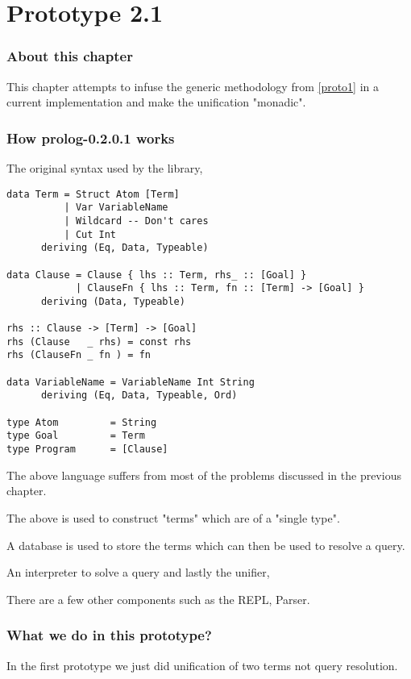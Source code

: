 \documentclass[thesis-solanki.tex]{subfiles}
\begin{document}
\chapter{Prototype 2.1}{\label{proto2.1}}

\subsection{About this chapter}
This chapter attempts to infuse the generic methodology from \ref{proto1} in a current  implementation \cite{prolog-lib}
and make the unification "monadic".

\subsection{How prolog-0.2.0.1 works}

The original syntax used by the library,

\begin{verbatim}
data Term = Struct Atom [Term]
          | Var VariableName
          | Wildcard -- Don't cares 
          | Cut Int
      deriving (Eq, Data, Typeable)

data Clause = Clause { lhs :: Term, rhs_ :: [Goal] }
            | ClauseFn { lhs :: Term, fn :: [Term] -> [Goal] }
      deriving (Data, Typeable)

rhs :: Clause -> [Term] -> [Goal]      
rhs (Clause   _ rhs) = const rhs
rhs (ClauseFn _ fn ) = fn

data VariableName = VariableName Int String
      deriving (Eq, Data, Typeable, Ord)

type Atom         = String
type Goal         = Term
type Program      = [Clause]
\end{verbatim} 

The above language suffers from most of the problems discussed in the previous chapter.

The above is used to construct  "terms" which are of a "single type".   

A database is used to store the terms which can then be used to resolve a query.

An interpreter to solve a query and lastly the unifier,

 


There are a few other components such as the REPL, Parser. 




\subsection{What we do in this prototype?}
In the first prototype we just did unification of two terms not query resolution.
\end{document}
